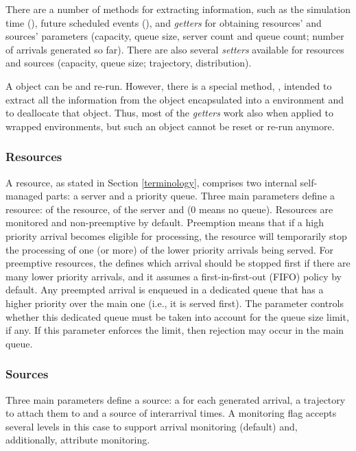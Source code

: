 \documentclass[
  nojss]{jss}
\begin{document}
There are a number of methods for extracting information, such as the
simulation time (), future scheduled events (),
and \emph{getters} for obtaining resources' and sources' parameters
(capacity, queue size, server count and queue count; number of arrivals
generated so far). There are also several \emph{setters} available for
resources and sources (capacity, queue size; trajectory, distribution).

A  object can be  and re-run. However, there
is a special method, , intended to extract all the
information from the  object encapsulated into a
 environment and to deallocate that object. Thus, most of
the \emph{getters} work also when applied to wrapped environments, but
such an object cannot be reset or re-run anymore.

\hypertarget{resources}{%
\subsubsection{Resources}\label{resources}}

A  resource, as stated in Section \ref{terminology},
comprises two internal self-managed parts: a server and a priority
queue. Three main parameters define a resource:  of the
resource,  of the server and  (0 means
no queue). Resources are monitored and non-preemptive by default.
Preemption means that if a high priority arrival becomes eligible for
processing, the resource will temporarily stop the processing of one (or
more) of the lower priority arrivals being served. For preemptive
resources, the  defines which arrival should be
stopped first if there are many lower priority arrivals, and it assumes
a first-in-first-out (FIFO) policy by default. Any preempted arrival is
enqueued in a dedicated queue that has a higher priority over the main
one (i.e., it is served first). The  parameter
controls whether this dedicated queue must be taken into account for the
queue size limit, if any. If this parameter enforces the limit, then
rejection may occur in the main queue.

\hypertarget{sources}{%
\subsubsection{Sources}\label{sources}}

Three main parameters define a source: a  for each
generated arrival, a trajectory to attach them to and a source of
interarrival times. A monitoring flag accepts several levels in this
case to support arrival monitoring (default) and, additionally,
attribute monitoring.
\end{document}

